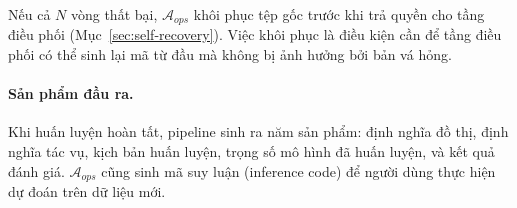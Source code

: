 Nếu cả $N$ vòng thất bại, $\mathcal{A}_{ops}$ khôi phục tệp gốc trước khi trả quyền cho tầng điều phối (Mục~\ref{sec:self-recovery}). Việc khôi phục là điều kiện cần để tầng điều phối có thể sinh lại mã từ đầu mà không bị ảnh hưởng bởi bản vá hỏng.

\paragraph{Sản phẩm đầu ra.}
Khi huấn luyện hoàn tất, pipeline sinh ra năm sản phẩm: định nghĩa đồ thị, định nghĩa tác vụ, kịch bản huấn luyện, trọng số mô hình đã huấn luyện, và kết quả đánh giá. $\mathcal{A}_{ops}$ cũng sinh mã suy luận (inference code) để người dùng thực hiện dự đoán trên dữ liệu mới.

